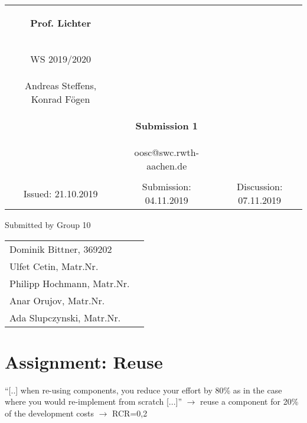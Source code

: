 \documentclass[a4paper,12pt,oneside]{scrreprt}
\begin{document}
\begin{tabular}{ccc}
	\begin{large} \textbf{Prof. Lichter} \end{large} &
	
	\begin{minipage}[H]{3.5cm}
	\centering
		\begin{large} OOSC \end{large} \\
		\begin{large} WS 2019/2020 \end{large}
	\end{minipage} &
	
	\begin{minipage}[H]{4cm}
	\end{minipage} \\
Andreas Steffens, Konrad F\"ogen &  &  \\
& \begin{huge} \textbf{Submission 1} \end{huge}&  \\
& oosc@swc.rwth-aachen.de &  \\
& & \\
Issued: 21.10.2019 &
Submission: 04.11.2019 &
Discussion: 07.11.2019 \\
\end{tabular}
\newline \newline \newline
\centering
Submitted by Group 10

\begin{tabular}{ll}
Dominik Bittner, 369202 \\
Ulfet Cetin, Matr.Nr.  \\
Philipp Hochmann, Matr.Nr.  \\
Anar Orujov, Matr.Nr. \\
Ada Slupczynski, Matr.Nr. \\
\end{tabular}

\setcounter{chapter}{1} %
\section{Assignment: Reuse}


"`[..] when re-using components, you reduce your effort by 80\% as in
the case where you would re-implement from scratch [...]"' $\rightarrow$ reuse a component for 20\% of the development costs $\rightarrow$ RCR=0,2
\end{document}
